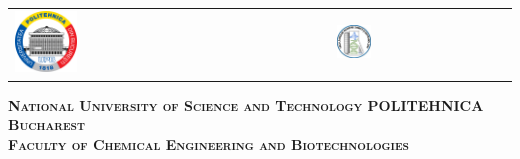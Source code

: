 



\begin{titlepage}
	\centering
	\begin{tabular}{p{6cm}p{3.3cm}}
		\includegraphics[width=0.2\textwidth]{img/upb.png} &
		\includegraphics[width=0.2\textwidth]{img/ficb.jpg}
	\end{tabular}
	\vspace{1cm}

	{\scshape\Large \textbf{National University of Science and Technology POLITEHNICA Bucharest} \\}
	{\scshape\Large \textbf{Faculty of Chemical Engineering and Biotechnologies} \\}
	
\end{titlepage}

